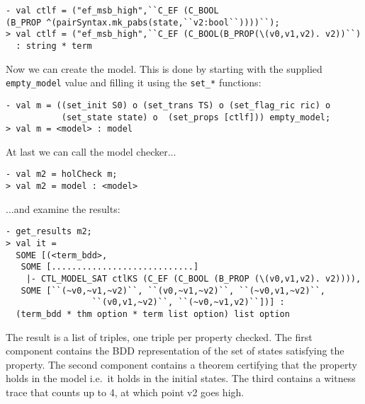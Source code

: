 \documentclass[12pt,fleqn]{article}
\begin{document}
\begin{session}\begin{verbatim}
- val ctlf = ("ef_msb_high",``C_EF (C_BOOL
(B_PROP ^(pairSyntax.mk_pabs(state,``v2:bool``))))``);
> val ctlf = ("ef_msb_high",``C_EF (C_BOOL(B_PROP(\(v0,v1,v2). v2))``)
  : string * term
\end{verbatim}\end{session}
Now we can create the model. This is done by starting with the supplied \texttt{empty\_model} value and filling it using the \texttt{set\_*} functions:
\begin{session}\begin{verbatim}
- val m = ((set_init S0) o (set_trans TS) o (set_flag_ric ric) o
           (set_state state) o  (set_props [ctlf])) empty_model;
> val m = <model> : model
\end{verbatim}\end{session}
At last we can call the model checker...
\begin{session}\begin{verbatim}
- val m2 = holCheck m;
> val m2 = model : <model>
\end{verbatim}\end{session}
...and examine the results:
\begin{session}\begin{verbatim}
- get_results m2;
> val it =
  SOME [(<term_bdd>,
   SOME [............................]
    |- CTL_MODEL_SAT ctlKS (C_EF (C_BOOL (B_PROP (\(v0,v1,v2). v2)))),
   SOME [``(~v0,~v1,~v2)``, ``(v0,~v1,~v2)``, ``(~v0,v1,~v2)``,
                 ``(v0,v1,~v2)``, ``(~v0,~v1,v2)``])] :
  (term_bdd * thm option * term list option) list option
\end{verbatim}\end{session}
The result is a list of triples, one triple per property checked. The first component contains the BDD representation of the set of states satisfying the property. The second component contains a theorem certifying that the property holds in the model i.e.\ it holds in the initial states. The third contains a witness trace that counts up to 4, at which point v2 goes high.
\end{document}
